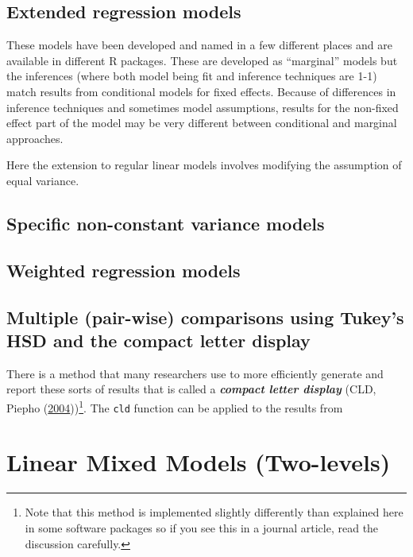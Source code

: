 \documentclass[
]{book}
\begin{document}
\hypertarget{section6-2}{%
\section{Extended regression models}\label{section6-2}}

These models have been developed and named in a few different places and are available in different R packages. These are developed as ``marginal'' models but the inferences (where both model being fit and inference techniques are 1-1) match results from conditional models for fixed effects. Because of differences in inference techniques and sometimes model assumptions, results for the non-fixed effect part of the model may be very different between conditional and marginal approaches.

Here the extension to regular linear models involves modifying the assumption of equal variance.

\hypertarget{section6-3}{%
\section{Specific non-constant variance models}\label{section6-3}}

\hypertarget{section6-4}{%
\section{Weighted regression models}\label{section6-4}}

\hypertarget{section6-5}{%
\section{Multiple (pair-wise) comparisons using Tukey's HSD and the compact letter display}\label{section6-5}}

\indent There is a method that many researchers use to more efficiently generate and
report these sorts of results that is called a \textbf{\emph{compact letter display}} 
(CLD, Piepho (\protect\hyperlink{ref-Piepho2004}{2004}))\footnote{Note that this method is implemented slightly differently than explained here in some software packages so if you see this in a journal article, read the discussion carefully.}. The \texttt{cld} function can be applied to the results from

\hypertarget{chapter7}{%
\chapter{Linear Mixed Models (Two-levels)}\label{chapter7}}
\end{document}
